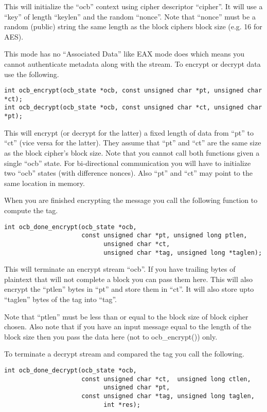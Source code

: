 \documentclass[b5paper]{book}
\begin{document}
This will initialize the ``ocb'' context using cipher descriptor ``cipher''.  It will use a ``key'' of length ``keylen''
and the random ``nonce''.  Note that ``nonce'' must be a random (public) string the same length as the block ciphers
block size (e.g. 16 for AES).

This mode has no ``Associated Data'' like EAX mode does which means you cannot authenticate metadata along with the stream.
To encrypt or decrypt data use the following.

\begin{verbatim}
int ocb_encrypt(ocb_state *ocb, const unsigned char *pt, unsigned char *ct);
int ocb_decrypt(ocb_state *ocb, const unsigned char *ct, unsigned char *pt);
\end{verbatim}

This will encrypt (or decrypt for the latter) a fixed length of data from ``pt'' to ``ct'' (vice versa for the latter).  
They assume that ``pt'' and ``ct'' are the same size as the block cipher's block size.  Note that you cannot call 
both functions given a single ``ocb'' state.  For bi-directional communication you will have to initialize two ``ocb''
states (with difference nonces).  Also ``pt'' and ``ct'' may point to the same location in memory.

When you are finished encrypting the message you call the following function to compute the tag.

\begin{verbatim}
int ocb_done_encrypt(ocb_state *ocb, 
                     const unsigned char *pt, unsigned long ptlen,
                           unsigned char *ct, 
                           unsigned char *tag, unsigned long *taglen);
\end{verbatim}

This will terminate an encrypt stream ``ocb''.  If you have trailing bytes of plaintext that will not complete a block 
you can pass them here.  This will also encrypt the ``ptlen'' bytes in ``pt'' and store them in ``ct''.  It will also
store upto ``taglen'' bytes of the tag into ``tag''.

Note that ``ptlen'' must be less than or equal to the block size of block cipher chosen.  Also note that if you have 
an input message equal to the length of the block size then you pass the data here (not to ocb\_encrypt()) only.  

To terminate a decrypt stream and compared the tag you call the following.

\begin{verbatim}
int ocb_done_decrypt(ocb_state *ocb, 
                     const unsigned char *ct,  unsigned long ctlen,
                           unsigned char *pt, 
                     const unsigned char *tag, unsigned long taglen, 
                           int *res);
\end{verbatim}
\end{document}
